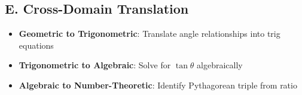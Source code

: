 \documentclass[12pt]{article}
\begin{document}
\begin{strategicbox}
\subsection*{E. Cross-Domain Translation}
\begin{itemize}[leftmargin=*]
    \item \textbf{Geometric to Trigonometric}: Translate angle relationships into trig equations
    
    \item \textbf{Trigonometric to Algebraic}: Solve for $\tan\theta$ algebraically
    
    \item \textbf{Algebraic to Number-Theoretic}: Identify Pythagorean triple from ratio
\end{itemize}
\end{strategicbox}
\end{document}

